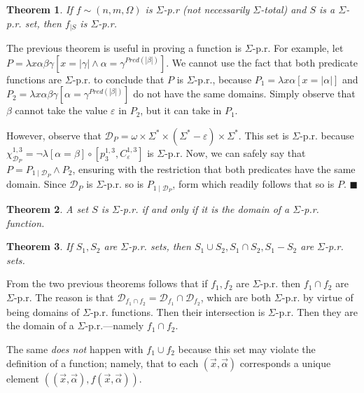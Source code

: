 \documentclass[a4paper, 12pt]{article}
\newtheorem{theorem}{Theorem}
\newtheorem{theorem}{Theorem}
\begin{document}
\begin{theorem}
    If $f \sim (n, m, \Omega)$ is $\Sigma$-p.r (not necessarily $\Sigma$-total) and $S$ is a $\Sigma$-p.r. set,
    then $f_{\mid S}$ is $\Sigma$-p.r. 
\end{theorem}

The previous theorem is useful in proving a function is $\Sigma$-p.r. For
example, let $P = \lambda x\alpha\beta \gamma \left[  x = |\gamma| \land \alpha
= \gamma^{Pred(|\beta|)}\right] $. We cannot use the fact that both predicate
functions are $\Sigma$-p.r. to conclude that $P$ is $\Sigma$-p.r., because $P_1
= \lambda x\alpha [x = |\alpha|]$ and $P_2 = \lambda x \alpha \beta \gamma
[\alpha =
\gamma^{Pred(|\beta|)}]$ do not have the same domains. Simply observe that
$\beta$ cannot take the value $\varepsilon$ in $P_2$, but it can take in $P_1$.


However, observe that $\mathcal{D}_P = \omega \times \Sigma^{*} \times
(\Sigma^{*} - \varepsilon) \times \Sigma^{*} $. This set is $\Sigma$-p.r. because
$\chi_{\mathcal{D}_P}^{1, 3} = \neg \lambda \left[ \alpha = \beta \right] \circ
\left[ p_{3}^{1, 3}, C_{\varepsilon}^{1, 3} \right]$ is $\Sigma$-p.r. Now, we can
safely say that $P = P_{1\mid \mathcal{D}_P} \land P_2$, ensuring with the
restriction that both predicates have the same domain. Since $\mathcal{D}_P$ is
$\Sigma$-p.r. so is $P_{1\mid \mathcal{D}_P}$, form which readily follows that
so is $P$. $\blacksquare$

\begin{theorem}
    A set $S$ is $\Sigma$-p.r. if and only if it is the domain of a
    $\Sigma$-p.r. function.
\end{theorem}

\begin{theorem}
    If $S_1, S_2$ are $\Sigma$-p.r. sets, then $S_1 \cup S_2, S_1\cap S_2, S_1 -
    S_2$ are $\Sigma$-p.r. sets.
\end{theorem}

From the two previous theorems follows that if $f_1, f_2$ are $\Sigma$-p.r. then
$f_1 \cap f_2$  are $\Sigma$-p.r. The reason is that $\mathcal{D}_{f_1 \cap f_2}
= \mathcal{D}_{f_1} \cap \mathcal{D}_f_2$, which are both $\Sigma$-p.r. by
virtue of being domains of $\Sigma$-p.r. functions. Then their intersection is
$\Sigma$-p.r. Then they are the domain of a $\Sigma$-p.r.---namely $f_1 \cap
f_2$.

The same \textit{does not} happen with $f_1 \cup f_2$ because this set may
violate the definition of a function; namely, that to each $(\vec{x}, \vec{\alpha}) $ corresponds a
unique element $((\vec{x}, \vec{\alpha}) , f(\vec{x}, \vec{\alpha}) )$.
\end{document}
